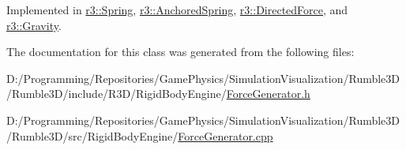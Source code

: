 Implemented in \mbox{\hyperlink{classr3_1_1_spring_ab2b8d52c2a2d838b939290b29320bf66}{r3\+::\+Spring}}, \mbox{\hyperlink{classr3_1_1_anchored_spring_a56aaf13c1f89f2b45b6cb95bf16a2300}{r3\+::\+Anchored\+Spring}}, \mbox{\hyperlink{classr3_1_1_directed_force_a13dc064fe26dabe6c2803f027079e26b}{r3\+::\+Directed\+Force}}, and \mbox{\hyperlink{classr3_1_1_gravity_ae1d29cae93289b8063d8833a7107ae64}{r3\+::\+Gravity}}.



The documentation for this class was generated from the following files\+:\begin{DoxyCompactItemize}
\item 
D\+:/\+Programming/\+Repositories/\+Game\+Physics/\+Simulation\+Visualization/\+Rumble3\+D/\+Rumble3\+D/include/\+R3\+D/\+Rigid\+Body\+Engine/\mbox{\hyperlink{_force_generator_8h}{Force\+Generator.\+h}}\item 
D\+:/\+Programming/\+Repositories/\+Game\+Physics/\+Simulation\+Visualization/\+Rumble3\+D/\+Rumble3\+D/src/\+Rigid\+Body\+Engine/\mbox{\hyperlink{_force_generator_8cpp}{Force\+Generator.\+cpp}}\end{DoxyCompactItemize}
